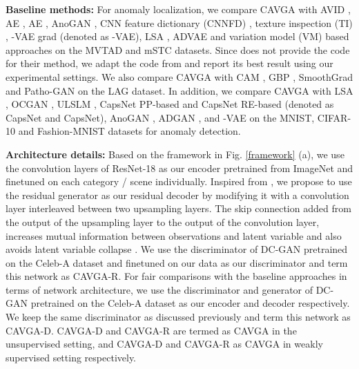 \documentclass[runningheads]{llncs}
\begin{document}
\textbf{Baseline methods:} For anomaly localization, we compare CAVGA with AVID \cite{sabokrou2018avid}, AE \cite{bergmann2018improving}, AE \cite{bergmann2018improving}, AnoGAN \cite{schlegl2017unsupervised}, CNN feature dictionary (CNNFD) \cite{napoletano2018anomaly}, texture inspection (TI) \cite{bottger2016real}, -VAE grad \cite{dehaene2020iterative} (denoted as -VAE), LSA \cite{abati2019latent}, ADVAE \cite{liu2019towards} and variation model (VM) \cite{steger2001similarity} based approaches on the MVTAD and mSTC datasets. Since \cite{dehaene2020iterative} does not provide the code for their method, we adapt the code from \cite{iclr20_code} and report its best result using our experimental settings. We also compare CAVGA with CAM \cite{zhou2016learning}, GBP \cite{springenberg2014striving}, SmoothGrad \cite{smilkov2017smoothgrad} and Patho-GAN \cite{wang2019pathology} on the LAG dataset. In addition, we compare CAVGA with LSA \cite{abati2019latent}, OCGAN \cite{perera2019ocgan}, ULSLM \cite{wolf2020unsupervised}, CapsNet PP-based and CapsNet RE-based \cite{li2019exploring} (denoted as CapsNet and CapsNet), AnoGAN \cite{schlegl2017unsupervised}, ADGAN \cite{deecke2018image}, and -VAE \cite{higgins2017beta} on the MNIST, CIFAR-10 and Fashion-MNIST datasets for anomaly detection.

\textbf{Architecture details:} Based on the framework in Fig. \ref{framework} (a), we use the convolution layers of ResNet-18 \cite{he2016deep} as our encoder pretrained from ImageNet \cite{russakovsky2015imagenet} and finetuned on each category / scene individually. Inspired from \cite{brock2018large}, we propose to use the residual generator as our residual decoder by modifying it with a convolution layer interleaved between two upsampling layers. The skip connection added from the output of the upsampling layer to the output of the convolution layer, increases mutual information between observations and latent variable and also avoids latent variable collapse \cite{dieng2019avoiding}. We use the discriminator of DC-GAN \cite{radford2015unsupervised} pretrained on the Celeb-A dataset \cite{liu2015faceattributes} and finetuned on our data as our discriminator and term this network as CAVGA-R. For fair comparisons with the baseline approaches in terms of network architecture, we use the discriminator and generator of DC-GAN pretrained on the Celeb-A dataset as our encoder and decoder respectively. We keep the same discriminator as discussed previously and term this network as CAVGA-D. CAVGA-D and CAVGA-R are termed as CAVGA in the unsupervised setting, and CAVGA-D and CAVGA-R as CAVGA in weakly supervised setting respectively.
\end{document}
